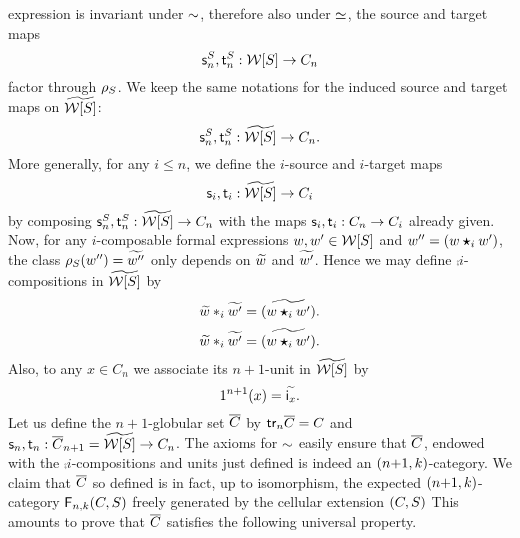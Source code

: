  expression is invariant under $\sim$, therefore also under $\simeq$, 
 the source and target maps
  \[\mathsf{s}_{n}^S,\mathsf{t}_{n}^S:\mathcal{W}[S]\to C_n\]
  factor through $\rho_{S}$. We keep the same notations for the induced
  source and target maps on $\widetilde{\mathcal{W}[S]}$:
  \[\mathsf{s}_{n}^S,\mathsf{t}_{n}^S:\widetilde{\mathcal{W}[S]}\to C_n.\]
  More generally, for any $i\leq n$, we define the $i$-source and
  $i$-target maps
  \[\mathsf{s}_{i},\mathsf{t}_{i}:\widetilde{\mathcal{W}[S]}\to C_i\]
  by composing $\mathsf{s}_{n}^S,\mathsf{t}_{n}^S:\widetilde{\mathcal{W}[S]}\to C_n$ with the maps $\mathsf{s}_{i},\mathsf{t}_{i}:C_n\to C_i$ already given. Now, for any $i$-composable formal expressions
  $w,w'\in \mathcal{W}[S]$ and $w''=(w\bm{\star}_{i} w')$, the class $\rho_{S}(w'')=\widetilde{w''}$ only
  depends on $\widetilde{w}$ and $\widetilde{w'}$. Hence we may define 
 $\comp i$-compositions in $\widetilde{\mathcal{W}[S]}$ by
 \[\widetilde{w}\ast_{i}\widetilde{w'}=\widetilde{(w\bm{\star}_{i} w')}.\]
 \[\widetilde{w}\ast_{i}\widetilde{w'}=\widetilde{(w\bm{\star}_{i} w')}.\]
 Also, to any $x\in C_n$ we associate its $n{+}1$-unit in $\widetilde{\mathcal{W}[S]}$ by
  \[1^{n+1}(x)=\widetilde{\mathsf{i}_{x}}.\]
  Let us define the $n{+}1$-globular set $\overline{C}$ by
  $\mathsf{tr}_{n}\overline{C}=C$ and $\mathsf{s}_{n},\mathsf{t}_{n}:\overline{C}_{n+1}=\widetilde{\mathcal{W}[S]}\to C_n$.
  The axioms for $\sim$ easily ensure that $\overline{C}$, endowed with
  the $\comp i$-compositions and units just defined is indeed an
  $(n{+}1,k)$-category. We claim that $\overline{C}$ so defined is
  in fact, up to isomorphism, the expected $(n{+}1,k)$-category
  $\mathsf{F}_{n,k}(C,S)$ freely generated by the cellular extension $(C,S)$
  This amounts to prove that $\overline{C}$ satisfies the following universal property.
  
